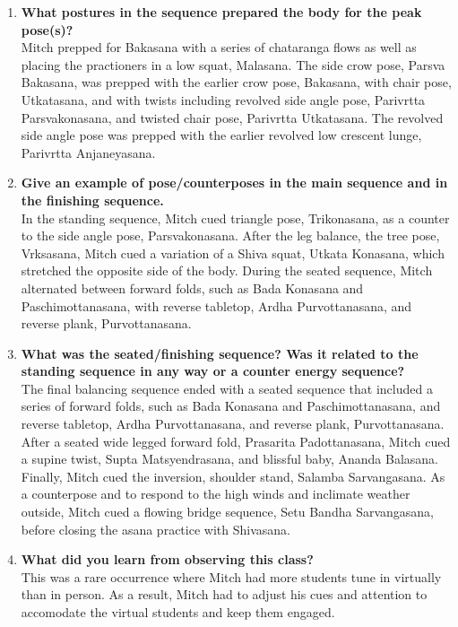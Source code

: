 \documentclass[10pt]{article}
\begin{document}
\begin{enumerate}
    \item \textbf{What postures in the sequence prepared the body for the peak pose(s)?}\\
    Mitch prepped for Bakasana with a series of chataranga flows as well as placing the practioners in a low squat, Malasana. The side crow pose, Parsva Bakasana, was prepped with the earlier crow pose, Bakasana, with chair pose, Utkatasana, and with twists including revolved side angle pose, Parivrtta Parsvakonasana, and twisted chair pose, Parivrtta Utkatasana. The revolved side angle pose was prepped with the earlier revolved low crescent lunge, Parivrtta Anjaneyasana.

    \item \textbf{Give an example of pose/counterposes in the main sequence and in the finishing sequence.}\\
    In the standing sequence, Mitch cued triangle pose, Trikonasana, as a counter to the side angle pose, Parsvakonasana. After the leg balance, the tree pose, Vrksasana, Mitch cued a variation of a Shiva squat, Utkata Konasana, which stretched the opposite side of the body. During the seated sequence, Mitch alternated between forward folds, such as Bada Konasana and Paschimottanasana, with reverse tabletop, Ardha Purvottanasana, and reverse plank, Purvottanasana. 

    \item \textbf{What was the seated/finishing sequence?  Was it related to the standing sequence in any way or a counter energy sequence?}\\
    The final balancing sequence ended with a seated sequence that included a series of forward folds, such as Bada Konasana and Paschimottanasana, and reverse tabletop, Ardha Purvottanasana, and reverse plank, Purvottanasana. After a seated wide legged forward fold, Prasarita Padottanasana, Mitch cued a supine twist, Supta Matsyendrasana, and blissful baby, Ananda Balasana. Finally, Mitch cued the inversion, shoulder stand, Salamba Sarvangasana. As a counterpose and to respond to the high winds and inclimate weather outside, Mitch cued a flowing bridge sequence, Setu Bandha Sarvangasana, before closing the asana practice with Shivasana.

    \item \textbf{What did you learn from observing this class?}\\
    This was a rare occurrence where Mitch had more students tune in virtually than in person. As a result, Mitch had to adjust his cues and attention to accomodate the virtual students and keep them engaged. 

\end{enumerate}
\end{document}
